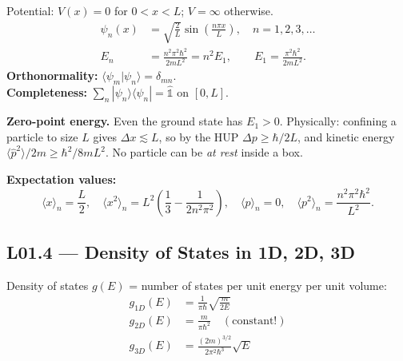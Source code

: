 \begin{tcolorbox}[lecturebox, title={L01.3 Main result}]
Potential: $V(x) = 0$ for $0 < x < L$; $V = \infty$ otherwise.
\begin{align}
  \psi_n(x) &= \sqrt{\frac{2}{L}}\sin\!\left(\frac{n\pi x}{L}\right), \quad
  n = 1, 2, 3, \ldots \label{eq:L01.5}\\
  E_n &= \frac{n^2\pi^2\hbar^2}{2mL^2} = n^2 E_1,
  \qquad E_1 = \frac{\pi^2\hbar^2}{2mL^2}. \label{eq:L01.6}
\end{align}
\textbf{Orthonormality:} $\langle\psi_m|\psi_n\rangle = \delta_{mn}$.\\
\textbf{Completeness:} $\sum_n |\psi_n\rangle\langle\psi_n| = \hat{\mathbb{1}}$ on $[0,L]$.
\end{tcolorbox}

\textbf{Zero-point energy.}
Even the ground state has $E_1 > 0$. Physically: confining a particle to size $L$
gives $\Delta x \lesssim L$, so by the HUP $\Delta p \geq \hbar/2L$, and kinetic
energy $\langle\hat{p}^2\rangle/2m \geq \hbar^2/8mL^2$. No particle can be
\emph{at rest} inside a box.

\textbf{Expectation values:}
\begin{equation}
  \langle x\rangle_n = \frac{L}{2}, \quad
  \langle x^2\rangle_n = L^2\!\left(\frac{1}{3} - \frac{1}{2n^2\pi^2}\right), \quad
  \langle p\rangle_n = 0, \quad
  \langle p^2\rangle_n = \frac{n^2\pi^2\hbar^2}{L^2}.
  \label{eq:L01.7}
\end{equation}

\subsection*{L01.4 — Density of States in 1D, 2D, 3D}
\label{sec:L01.4}

\begin{tcolorbox}[lecturebox, title={L01.4 Main result}]
Density of states $g(E)$ = number of states per unit energy per unit volume:
\begin{align}
  g_{1D}(E) &= \frac{1}{\pi\hbar}\sqrt{\frac{m}{2E}} \label{eq:L01.8}\\
  g_{2D}(E) &= \frac{m}{\pi\hbar^2} \quad (\text{constant!}) \label{eq:L01.9}\\
  g_{3D}(E) &= \frac{(2m)^{3/2}}{2\pi^2\hbar^3}\sqrt{E} \label{eq:L01.10}
\end{align}
\end{tcolorbox}


